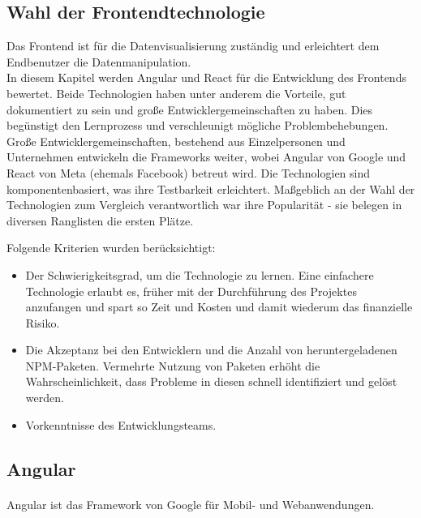 \subsection{Wahl der Frontendtechnologie}
Das Frontend ist für die Datenvisualisierung zuständig und erleichtert dem Endbenutzer die Datenmanipulation.\\
In diesem Kapitel werden Angular und React für die Entwicklung des Frontends bewertet. Beide Technologien haben unter anderem die Vorteile, gut dokumentiert zu sein und große Entwicklergemeinschaften zu haben. Dies begünstigt den Lernprozess und verschleunigt mögliche Problembehebungen. Große Entwicklergemeinschaften, bestehend aus Einzelpersonen und Unternehmen entwickeln die Frameworks weiter, wobei Angular von Google und React von Meta (ehemals Facebook) betreut wird. Die Technologien sind komponentenbasiert, was ihre Testbarkeit erleichtert. Maßgeblich an der Wahl der Technologien zum Vergleich verantwortlich war ihre Popularität - sie belegen in diversen Ranglisten die ersten Plätze.\cite{SO01}

Folgende Kriterien wurden berücksichtigt:
\begin{itemize}
  \item
        Der Schwierigkeitsgrad, um die Technologie zu lernen. Eine einfachere Technologie erlaubt es, früher mit der Durchführung des Projektes anzufangen und spart so Zeit und Kosten und damit wiederum das finanzielle Risiko.
  \item
        Die Akzeptanz bei den Entwicklern und die Anzahl von heruntergeladenen NPM-Paketen. Vermehrte Nutzung von Paketen erhöht die Wahrscheinlichkeit, dass Probleme in diesen schnell identifiziert und gelöst werden.\cite{LIN1}
  \item
        Vorkenntnisse des Entwicklungsteams.

\end{itemize}

\subsection{Angular}
\paragraph{}
Angular ist das Framework von Google für Mobil- und Webanwendungen.
\\

